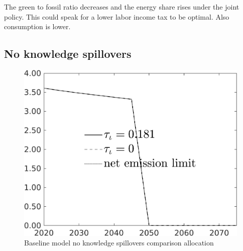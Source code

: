 \documentclass[12pt]{article}
\begin{document}
The green to fossil ratio decreases and the energy share rises under the joint policy. This could speak for a lower labor income tax to be optimal. 
Also consumption is lower. 


\clearpage \newpage
\subsection{No knowledge spillovers}
\begin{figure}[h!!]
	\centering
	\caption{Baseline model no knowledge spillovers comparison allocation}\label{fig:Leveltauf_nsk1_xgr0_noknow_notaul}
	\begin{minipage}[]{0.32\textwidth}
		\includegraphics[width=1\textwidth]{../../codding_model/own_basedOnFried/optimalPol_010922_revision/figures/all_13Sept22/CompTauf_bytaul_Reg0_Emnet_spillover0_nsk0_xgr0_knspil1_sep1_LFlimit1_emsbase0_countec0_GovRev0_etaa0.79_lgd1.png}
	\end{minipage}		
	\begin{minipage}[]{0.32\textwidth}

\end{minipage}
\end{figure}
\end{document}
